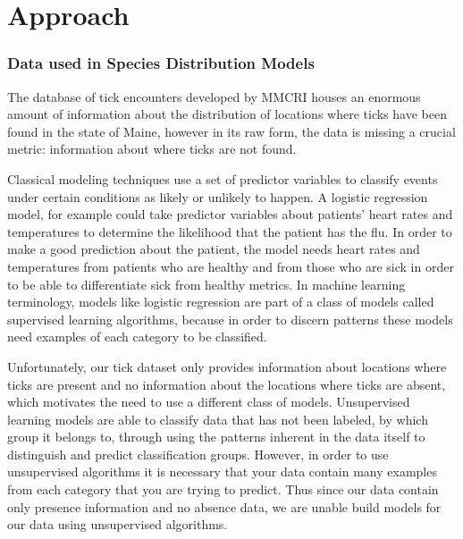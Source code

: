 
\chapter{Approach} %

\label{Chapter2} 



\subsection{Data used in Species Distribution Models}
\noindent The database of tick encounters developed by MMCRI houses an enormous amount of information about the distribution of locations where ticks have been found in the state of Maine, however in its raw form, the data is missing a crucial metric: information about where ticks are not found. \newline

\noindent Classical modeling techniques use a set of predictor variables to classify events under certain conditions as likely or unlikely to happen. A logistic regression model, for example could take predictor variables about patients' heart rates and temperatures to determine the likelihood that the patient has the flu. In order to make a good prediction about the patient, the model needs heart rates and temperatures from patients who are healthy and from those who are sick in order to be able to differentiate sick from healthy metrics. In machine learning terminology, models like logistic regression are part of a class of models called supervised learning algorithms, because in order to discern patterns these models need examples of each category to be classified. \newline

\noindent Unfortunately, our tick dataset only provides information about locations where ticks are present and no information about the locations where ticks are absent, which motivates the need to use a different class of models. Unsupervised learning models are able to classify data that has not been labeled, by which group it belongs to, through using the patterns inherent in the data itself to distinguish and predict classification groups. However, in order to use unsupervised algorithms it is necessary that your data contain many examples from each category that you are trying to predict. Thus since our data contain only presence information and no absence data, we are unable build models for our data using unsupervised algorithms. \newline

